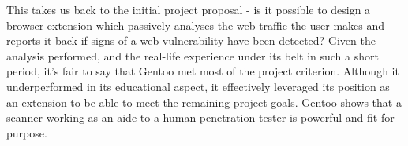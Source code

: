  This takes us back to the initial project proposal - is it possible to design a browser extension which passively analyses the web traffic the user makes and reports it back if signs of a web vulnerability have been detected? Given the analysis performed, and the real-life experience under its belt in such a short period, it's fair to say that Gentoo met most of the project criterion. Although it underperformed in its educational aspect, it effectively leveraged its position as an extension to be able to meet the remaining project goals. Gentoo shows that a scanner working as an aide to a human penetration tester is powerful and fit for purpose.
 




































